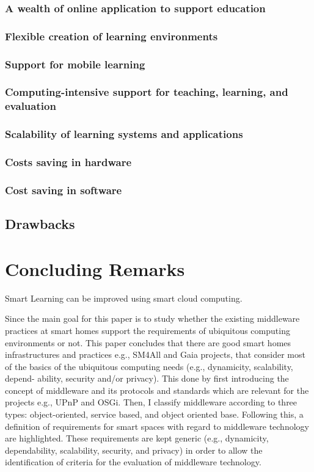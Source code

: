 \documentclass[journal]{vgtc}                %
\begin{document}
    \subsubsection{A wealth of online application to support education}
    \subsubsection{Flexible creation of learning environments}
    \subsubsection{Support for mobile learning}
    \subsubsection{Computing-intensive support for teaching, learning, and evaluation}
    \subsubsection{Scalability of learning systems and applications}
    \subsubsection{Costs saving in hardware}
    \subsubsection{Cost saving in software}
  \subsection{Drawbacks} %
  


\section{Concluding Remarks}
Smart Learning can be improved using smart cloud computing.

Since the main goal for this paper is to study whether the existing middleware practices at smart homes support the requirements of ubiquitous computing environments or not. This paper concludes that there are good smart homes infrastructures and practices e.g., SM4All and Gaia projects, that consider most of the basics of the ubiquitous computing needs (e.g., dynamicity, scalability, depend- ability, security and/or privacy). This done by first introducing the concept of middleware and its protocols and standards which are relevant for the projects e.g., UPnP and OSGi. Then, I classify middleware according to three types: object-oriented, service based, and object oriented base. Following this, a definition of requirements for smart spaces with regard to middleware technology are highlighted. These requirements are kept generic (e.g., dynamicity, dependability, scalability, security, and privacy) in order to allow the identification of criteria for the evaluation of middleware technology.
\end{document}
